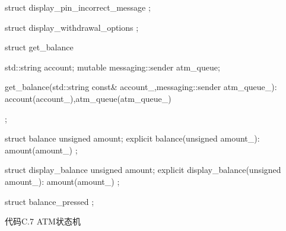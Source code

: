 \begin{cpp}
struct display_pin_incorrect_message
{};

struct display_withdrawal_options
{};

struct get_balance
{
  std::string account;
  mutable messaging::sender atm_queue;

  get_balance(std::string const& account_,messaging::sender atm_queue_):
    account(account_),atm_queue(atm_queue_)
  {}
};

struct balance
{
  unsigned amount;
  explicit balance(unsigned amount_):
    amount(amount_)
  {}
};

struct display_balance
{
  unsigned amount;
  explicit display_balance(unsigned amount_):
    amount(amount_)
  {}
};

struct balance_pressed
{};
\end{cpp}

代码C.7 ATM状态机

